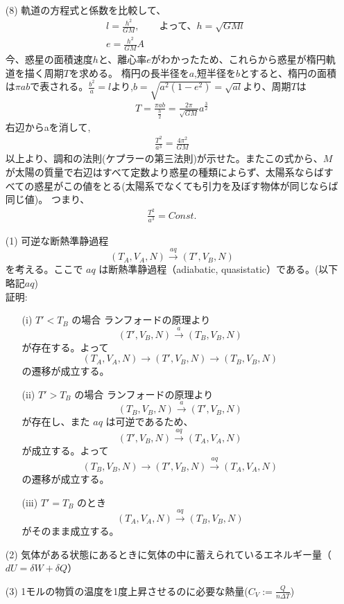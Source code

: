 \documentclass{jsarticle}
\begin{document}
\begin{itemize}
\begin{itemize}
\begin{align*}
    \end{align*}  
  \end{itemize}  
  \item[(8)]  軌道の方程式と係数を比較して、
  \begin{align*}
    &l=\frac{h^2}{GM},\qquad \text{よって、}h=\sqrt{GMl} \\
    &e=\frac{h^2}{GM}A 
  \end{align*}
今、惑星の面積速度$h$と、離心率$e$がわかったため、これらから惑星が楕円軌道を描く周期$T$を求める。
\leavevmode 楕円の長半径を$a$,短半径を$b$とすると、楕円の面積は$\pi ab$で表される。$\frac{b^2}{a}=l$より,$b=\sqrt{a^2(1-e^2)}=\sqrt{al}$より、周期$T$は
  \begin{align*}
    T=\frac{\pi ab}{\frac{h}{2}}=\frac{2\pi}{\sqrt{GM}}a^\frac{3}{2}
  \end{align*}  
    右辺からaを消して,
  \begin{align}
    \frac{T^2}{a^3}=\frac{4\pi^2}{GM} 
  \end{align}
  以上より、調和の法則(ケプラーの第三法則)が示せた。またこの式から、$M$が太陽の質量で右辺はすべて定数より惑星の種類によらず、太陽系ならばすべての惑星がこの値をとる(太陽系でなくても引力を及ぼす物体が同じならば同じ値)。
  つまり、
  \begin{align*}
    \frac{T^2}{a^3}=Const.
  \end{align*}
  \end{itemize}     
  \begin{itemize}
  \item[(1)]
  可逆な断熱準静過程
  \[(T_A, V_A, N) \xrightarrow{aq} (T', V_B, N)\]
  を考える。ここで $aq$ は断熱準静過程（adiabatic, quasistatic）である。(以下略記$aq$)
  \leavevmode\\
  証明:
    \begin{itemize}
      \item[(i)]$T' < T_B$ の場合  
      ランフォードの原理より
      \[(T', V_B, N) \xrightarrow{a} (T_B, V_B, N)\]が存在する。よって
      \[(T_A, V_A, N) \to (T', V_B, N) \to (T_B, V_B, N)\]の遷移が成立する。
      \item[(ii)] $T' > T_B$ の場合  
      ランフォードの原理より
      \[(T_B, V_B, N) \xrightarrow{a} (T', V_B, N)\]
      が存在し、また $aq$ は可逆であるため、
      \[(T', V_B, N) \xrightarrow{aq} (T_A, V_A, N)\]が成立する。よって
      \[(T_B, V_B, N) \to (T', V_B, N) \xrightarrow{aq} (T_A, V_A, N)\]の遷移が成立する。
      \item[(iii)] $T' = T_B$ のとき
      \[(T_A, V_A, N) \xrightarrow{aq} (T_B, V_B, N)\]
      がそのまま成立する。
    \end{itemize} 
  \item[(2)] 気体がある状態にあるときに気体の中に蓄えられているエネルギー量（$dU = \delta W + \delta Q$）
  \item[(3)] 1モルの物質の温度を1度上昇させるのに必要な熱量($C_V:=\frac{Q}{n\Delta T}$) 
  \end{itemize}
\end{document}

